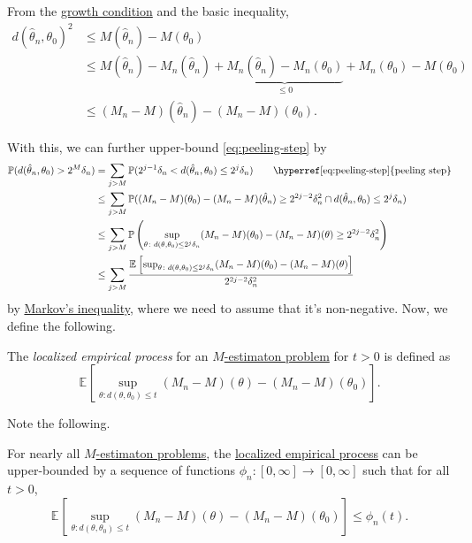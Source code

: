 \begin{note}
	From the \hyperref[def:growth-condition*]{growth condition} and the basic inequality,
	\[
		\begin{split}
			d(\hat{\theta} _n, \theta _0)^2
			&\leq M(\hat{\theta} _n ) - M(\theta _0)\\
			&\leq M(\hat{\theta} _n) - M_n(\hat{\theta} _n) + \underbrace{M_n(\hat{\theta} _n) - M_n(\theta _0)}_{\leq 0} + M_n(\theta _0) - M(\theta _0)\\
			&\leq (M_n - M)(\hat{\theta} _n) - (M_n - M)(\theta _0).
		\end{split}
	\]
\end{note}

With this, we can further upper-bound \autoref{eq:peeling-step} by
\begin{align*}
	\mathbb{P} (d(\hat{\theta} _n, \theta _0) > 2^M \delta _n)
	 & = \sum_{j > M} \mathbb{P} (2^{j-1} \delta _n < d(\hat{\theta} _n, \theta _0) \leq 2^j \delta _n)\tag*{\hyperref[eq:peeling-step]{peeling step}}                                        \\
	 & \leq \sum_{j > M} \mathbb{P} ((M_n - M)(\theta _0) - (M_n - M)(\hat{\theta} _n) \geq 2^{2j-2} \delta _n^2 \cap d(\hat{\theta} _n, \theta _0) \leq 2^j \delta _n)                       \\
	 & \leq \sum_{j > M} \mathbb{P} \left( \sup _{\theta \colon d(\theta , \theta _0) \leq 2^j \delta _n} (M_n - M)(\theta _0) - (M_n - M)(\theta ) \geq 2^{2j - 2} \delta _n^2 \right)       \\
	 & \leq \sum_{j > M} \frac{\mathbb{E}_{}\left[\sup _{\theta \colon d(\theta , \theta _0) \leq 2^j \delta _n} (M_n - M)(\theta _0) - (M_n - M)(\theta ) \right] }{2^{2j - 2} \delta _n^2 }
\end{align*}
by \hyperref[lma:Markov-inequality]{Markov's  inequality}, where we need to assume that it's non-negative. Now, we define the following.

\begin{definition}\label{def:localized-EP}
	The \emph{localized empirical process} for an \hyperref[prb:M-estimation]{\(M\)-estimaton problem} for \(t > 0\) is defined as
	\[
		\mathbb{E}_{}\left[\sup _{\theta \colon d(\theta , \theta _0) \leq t} (M_n - M)(\theta ) - (M_n - M)(\theta _0) \right].
	\]
\end{definition}

Note the following.

\begin{note}
	For nearly all \hyperref[prb:M-estimation]{\(M\)-estimaton problems}, the \hyperref[def:localized-EP]{localized empirical process} can be upper-bounded by a sequence of functions \(\phi _n\colon [0, \infty ] \to [0, \infty ]\) such that for all \(t > 0\),
	\[
		\mathbb{E}_{}\left[\sup _{\theta \colon d(\theta , \theta _0) \leq t} (M_n - M)(\theta ) - (M_n - M)(\theta _0) \right] \leq \phi _n(t).
	\]
\end{note}

